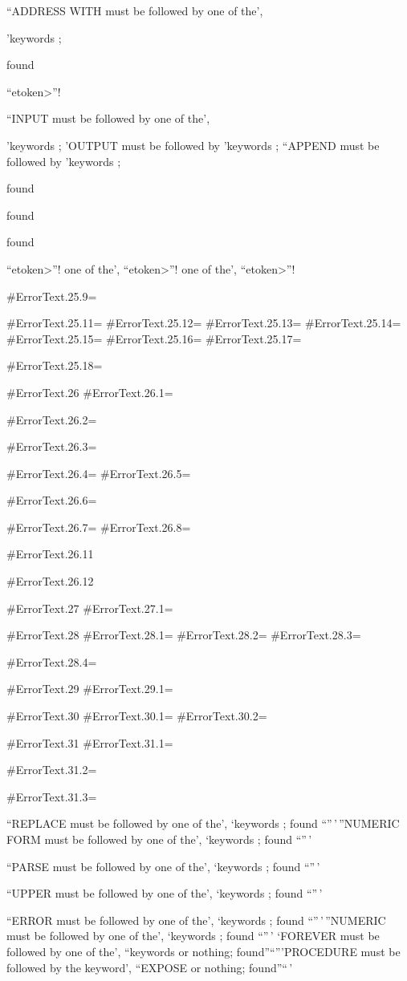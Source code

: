 ``ADDRESS WITH must be followed by one of the',

'keywords ;

found

``etoken\textgreater{}''!

``INPUT must be followed by one of the',

'keywords ; 'OUTPUT must be followed by 'keywords ; ``APPEND must be
followed by 'keywords ;

found

found

found

``etoken\textgreater{}''! one of the', ``etoken\textgreater{}''! one of
the', ``etoken\textgreater{}''!

\#ErrorText.25.9=

\#ErrorText.25.11= \#ErrorText.25.12= \#ErrorText.25.13=
\#ErrorText.25.14= \#ErrorText.25.15= \#ErrorText.25.16=
\#ErrorText.25.17=

\#ErrorText.25.18=

\#ErrorText.26 \#ErrorText.26.1=

\#ErrorText.26.2=

\#ErrorText.26.3=

\#ErrorText.26.4= \#ErrorText.26.5=

\#ErrorText.26.6=

\#ErrorText.26.7= \#ErrorText.26.8=

\#ErrorText.26.11

\#ErrorText.26.12

\#ErrorText.27 \#ErrorText.27.1=

\#ErrorText.28 \#ErrorText.28.1= \#ErrorText.28.2= \#ErrorText.28.3=

\#ErrorText.28.4=

\#ErrorText.29 \#ErrorText.29.1=

\#ErrorText.30 \#ErrorText.30.1= \#ErrorText.30.2=

\#ErrorText.31 \#ErrorText.31.1=

\#ErrorText.31.2=

\#ErrorText.31.3=

``REPLACE must be followed by one of the', `keywords ; found
``''\,'\,''NUMERIC FORM must be followed by one of the', `keywords ;
found ``''\,'

``PARSE must be followed by one of the', `keywords ; found ``''\,'

``UPPER must be followed by one of the', `keywords ; found ``''\,'

``ERROR must be followed by one of the', `keywords ; found
``''\,'\,''NUMERIC must be followed by one of the', `keywords ; found
``''\,' `FOREVER must be followed by one of the', ``keywords or nothing;
found''``'''PROCEDURE must be followed by the keyword', ``EXPOSE or
nothing; found''``\,'

